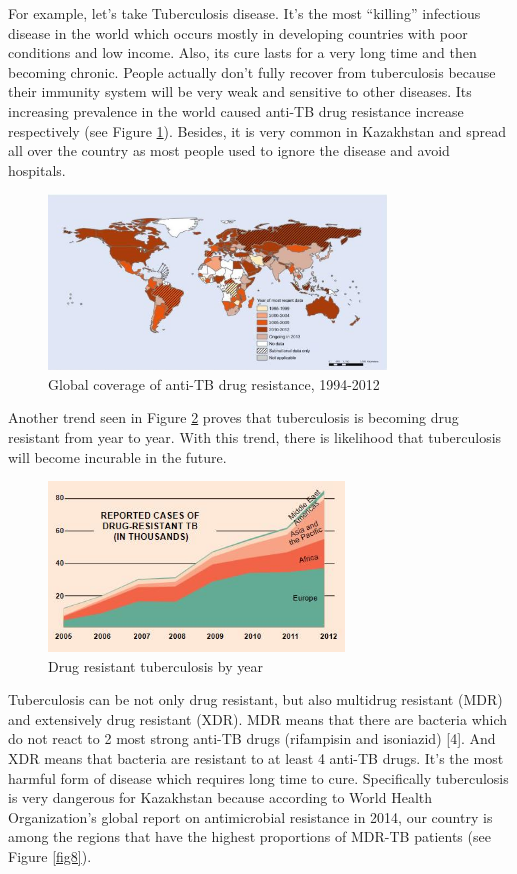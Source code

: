 For example, let’s take Tuberculosis disease. It’s the most “killing” infectious disease in the world which occurs mostly in developing countries with poor conditions and low income. Also, its cure lasts for a very long time and then becoming chronic. People actually don’t fully recover from tuberculosis because their immunity system will be very weak and sensitive to other diseases. Its increasing prevalence in the world caused anti-TB drug resistance increase respectively (see Figure \ref{fig6}). Besides, it is very common in Kazakhstan and spread all over the country as most people used to ignore the disease and avoid hospitals.

\begin{figure}[H]
  \centering
  \includegraphics[width=0.8\textwidth]{img/Fig6}
  \caption{Global coverage of anti-TB drug resistance, 1994-2012}
  \label{fig6}
\end{figure}

Another trend seen in Figure \ref{fig7} proves that tuberculosis is becoming drug resistant from year to year. With this trend, there is likelihood that tuberculosis will become incurable in the future.

\begin{figure}[H]
  \centering
  \includegraphics[width=0.7\textwidth]{img/Fig7}
  \caption{Drug resistant tuberculosis by year}
  \label{fig7}
\end{figure}

Tuberculosis can be not only drug resistant, but also multidrug resistant (MDR) and extensively drug resistant (XDR). MDR means that there are bacteria which do not react to 2 most strong anti-TB drugs (rifampisin and isoniazid) [4]. And XDR means that bacteria are resistant to at least 4 anti-TB drugs. It’s the most harmful form of disease which requires long time to cure. Specifically tuberculosis is very dangerous for Kazakhstan because according to World Health Organization’s global report on antimicrobial resistance in 2014, our country is among the regions that have the highest proportions of MDR-TB patients (see Figure \ref{fig8}).

